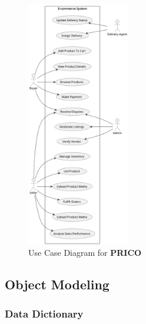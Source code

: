 \documentclass[12pt]{report}
\begin{document}
\begin{figure}[H]
	\begin{center}
		\includegraphics[width=0.4\textwidth]{diagrams/use-case}
	\end{center}
	\caption{Use Case Diagram for \textbf{PRICO}}
\end{figure}

\subsection{Object Modeling}

\subsubsection{Data Dictionary}
\end{document}
